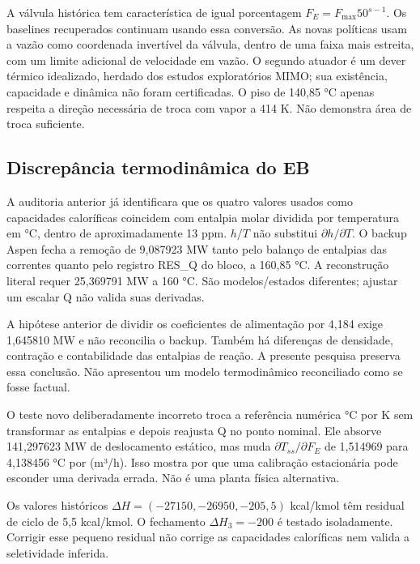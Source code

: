 \documentclass[
  11pt,
  letterpaper,
]{article}
\begin{document}
A válvula histórica tem característica de igual porcentagem
\(F_E=F_{\max}50^{s-1}\). Os baselines recuperados continuam usando essa
conversão. As novas políticas usam a vazão como coordenada invertível da
válvula, dentro de uma faixa mais estreita, com um limite adicional de
velocidade em vazão. O segundo atuador é um dever térmico idealizado,
herdado dos estudos exploratórios MIMO; sua existência, capacidade e
dinâmica não foram certificadas. O piso de 140,85 °C apenas respeita a
direção necessária de troca com vapor a 414 K. Não demonstra área de
troca suficiente.

\hypertarget{discrepuxe2ncia-termodinuxe2mica-do-eb}{%
\subsection{Discrepância termodinâmica do
EB}\label{discrepuxe2ncia-termodinuxe2mica-do-eb}}

A auditoria anterior já identificara que os quatro valores usados como
capacidades caloríficas coincidem com entalpia molar dividida por
temperatura em °C, dentro de aproximadamente 13 ppm. \(h/T\) não
substitui \(\partial h/\partial T\). O backup Aspen fecha a remoção de
9,087923 MW tanto pelo balanço de entalpias das correntes quanto pelo
registro RES\_\allowbreak{}Q do bloco, a 160,85 °C. A reconstrução literal requer
25,369791 MW a 160 °C. São modelos/estados diferentes; ajustar um
escalar Q não valida suas derivadas.

A hipótese anterior de dividir os coeficientes de alimentação por 4,184
exige 1,645810 MW e não reconcilia o backup. Também há diferenças de
densidade, contração e contabilidade das entalpias de reação. A presente
pesquisa preserva essa conclusão. Não apresentou um modelo termodinâmico
reconciliado como se fosse factual.

O teste novo deliberadamente incorreto troca a referência numérica °C
por K sem transformar as entalpias e depois reajusta Q no ponto nominal.
Ele absorve 141,297623 MW de deslocamento estático, mas muda
\(\partial T_{ss}/\partial F_E\) de 1,514969 para 4,138456 °C por
(m³/h). Isso mostra por que uma calibração estacionária pode esconder
uma derivada errada. Não é uma planta física alternativa.

Os valores históricos \(\Delta H=(-27150,-26950,-205{,}5)\) kcal/kmol
têm residual de ciclo de 5,5 kcal/kmol. O fechamento \(\Delta H_3=-200\)
é testado isoladamente. Corrigir esse pequeno residual não corrige as
capacidades caloríficas nem valida a seletividade inferida.
\end{document}
